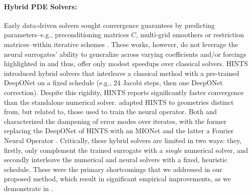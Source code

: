 \documentclass{article} %
\begin{document}
\paragraph{Hybrid PDE Solvers:}
Early data-driven solvers sought convergence guarantees by predicting parameters--e.g., preconditioning matrices $C$, multi-grid smoothers or restriction matrices--within iterative schemes \citep{taghibakhshi2021optimization,caldana2024deep,kopanivcakova2025deeponet,huang2022learning,katrutsa2020black}. These works, however, do not leverage the neural surrogates' ability to generalize across varying coefficients and/or forcings highlighted in  and thus, offer only modest speedups over classical solvers. HINTS \citep{zhang2024blending} introduced hybrid solvers that interleave a classical method with a pre-trained DeepONet on a fixed schedule (e.g., 24 Jacobi steps, then one DeepONet correction).
Despite this rigidity, HINTS reports significantly faster convergence than the standalone numerical solver. 
\citet{kahana2023geometry} adapted HINTS to geometries distinct from, but related to, those used to train the neural operator. Both \citet{hu2025hybrid} and \citet{cui2022fourier} characterized the dampening of error modes over iterates, with the former replacing the DeepONet of HINTS with an MIONet \citep{jin2022mionet} and the latter a Fourier Neural Operator \citep{li2020fourier}. Critically, these hybrid solvers are limited in two ways: they, firstly, only complement the trained surrogate with a \textit{single} numerical solver, and secondly interleave the numerical and neural solvers with a fixed, heuristic schedule. These were the primary shortcomings that we addressed in our proposed method, which result in significant empirical improvements, as we demonstrate in .
\end{document}
